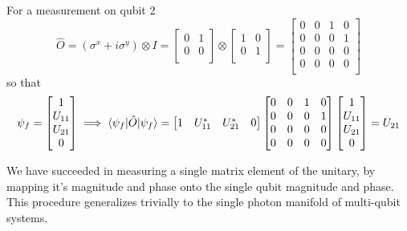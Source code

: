 \documentclass{article}
\begin{document}
    For a measurement on qubit 2
    \begin{equation}
        \hat{O}=(\sigma^{x} + i\sigma^{y}) \otimes I=
        \begin{bmatrix}
            0 & 1\\
            0 & 0\\
        \end{bmatrix}
        \otimes
        \begin{bmatrix}
            1 & 0\\
            0 & 1\\
        \end{bmatrix}
        =
        \begin{bmatrix}
            0 & 0 & 1 & 0\\
            0 & 0 & 0 & 1\\
            0 & 0 & 0 & 0\\
            0 & 0 & 0 & 0\\
        \end{bmatrix}
    \end{equation}
    so that
    \begin{equation}
        \psi_{f}=
        \begin{bmatrix}
            1 \\
            U_{11} \\
            U_{21} \\
            0 \\
        \end{bmatrix}
        \implies
        \braket{\psi_{f}|\hat{O}|\psi_{f}} =
        \begin{bmatrix}
            1 & U_{11}^{*} & U_{21}^{*} & 0
        \end{bmatrix}
        \begin{bmatrix}
            0 & 0 & 1 & 0\\
            0 & 0 & 0 & 1\\
            0 & 0 & 0 & 0\\
            0 & 0 & 0 & 0\\
        \end{bmatrix}
        \begin{bmatrix}
            1 \\
            U_{11} \\
            U_{21} \\
            0 \\
        \end{bmatrix}
        = U_{21}
    \end{equation}

    We have succeeded in measuring a single matrix element of the unitary, by mapping it's magnitude and phase onto the single qubit magnitude and phase.
    This procedure generalizes trivially to the single photon manifold of multi-qubit systems.
\end{document}
